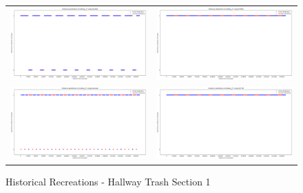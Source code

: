 \begin{figure}
  \begin{tabular}{cc}
    {\includegraphics[width = 3in]{images/results/Historical_hallway_T1_Duckett.png}} &
    {\includegraphics[width = 3in]{images/results/Historical_hallway_T1_FreMEn.png}} \\
    {\includegraphics[width = 3in]{images/results/Historical_hallway_T1_Gaussian.png}} &
    {\includegraphics[width = 3in]{images/results/Historical_hallway_T1_HyT-EM.png}} \\
  \end{tabular}
  \caption{Historical Recreations - Hallway Trash Section 1}
\end{figure}\\ \\


